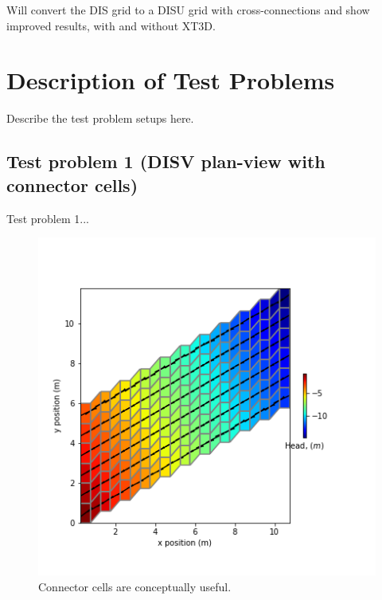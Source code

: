 \documentclass{article}
\begin{document}
Will convert the DIS grid to a DISU grid with cross-connections and show improved results, with and without XT3D.

\section{Description of Test Problems}

Describe the test problem setups here.

\subsection{Test problem 1 (DISV plan-view with connector cells)}

Test problem 1...

\begin{figure}
	\begin{center}
	\includegraphics{../figures/worm-zzag-x-i-head.png}
	\caption{Connector cells are conceptually useful.}
	\label{fig:worm-zzag-x-i-head}
	\end{center}
\end{figure}
\end{document}
